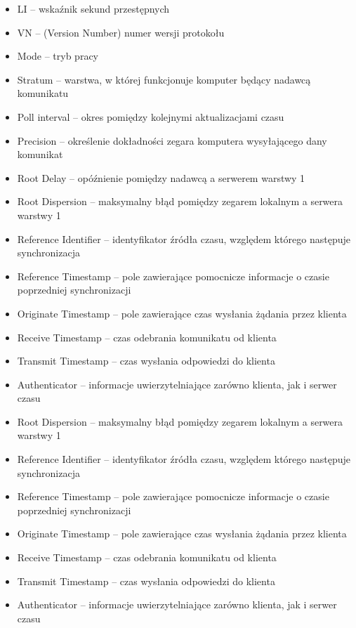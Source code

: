 \documentclass[../main.tex]{subfiles}
\begin{document}
\begin{itemize}
  \item LI – wskaźnik sekund przestępnych
  \item VN – (Version Number) numer wersji protokołu
  \item   Mode – tryb pracy
  \item Stratum – warstwa, w której funkcjonuje komputer będący nadawcą komunikatu
  \item Poll interval – okres pomiędzy kolejnymi aktualizacjami czasu
  \item Precision – określenie dokładności zegara komputera wysyłającego dany komunikat
  \item Root Delay – opóźnienie pomiędzy nadawcą a serwerem warstwy 1
  \item Root Dispersion – maksymalny błąd pomiędzy zegarem lokalnym a serwera warstwy 1
  \item Reference Identifier – identyfikator źródła czasu, względem którego następuje synchronizacja
  \item Reference Timestamp – pole zawierające pomocnicze informacje o czasie poprzedniej synchronizacji
  \item Originate Timestamp – pole zawierające czas wysłania żądania przez klienta
  \item Receive Timestamp – czas odebrania komunikatu od klienta
  \item Transmit Timestamp – czas wysłania odpowiedzi do klienta
  \item Authenticator – informacje uwierzytelniające zarówno klienta, jak i serwer czasu
  \item Root Dispersion – maksymalny błąd pomiędzy zegarem lokalnym a serwera warstwy 1
  \item Reference Identifier – identyfikator źródła czasu, względem którego następuje synchronizacja
  \item Reference Timestamp – pole zawierające pomocnicze informacje o czasie poprzedniej synchronizacji
  \item Originate Timestamp – pole zawierające czas wysłania żądania przez klienta
  \item Receive Timestamp – czas odebrania komunikatu od klienta
  \item Transmit Timestamp – czas wysłania odpowiedzi do klienta
  \item Authenticator – informacje uwierzytelniające zarówno klienta, jak i serwer czasu
\end{itemize}
\end{document}
